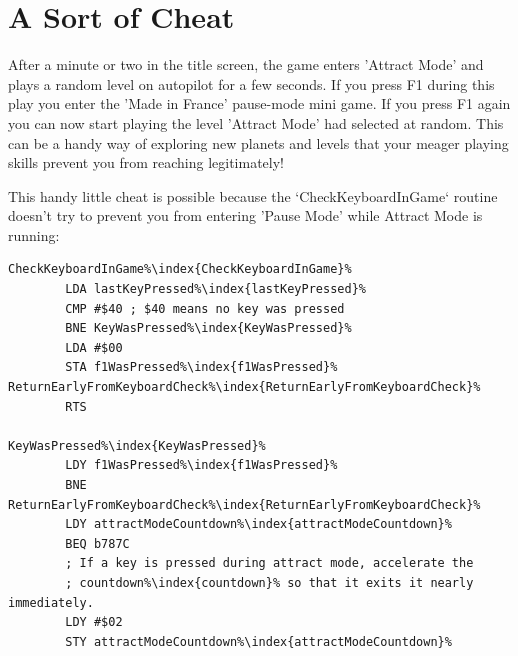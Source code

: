 \section{A Sort of Cheat}

After a minute or two in the title screen, the game enters 'Attract Mode' and
plays a random level on autopilot for a few seconds. If you press F1 during
this play you enter the 'Made in France' pause-mode mini game. If you press F1
again you can now start playing the level 'Attract Mode' had selected at random. This can be a handy way of exploring new planets and levels that your meager playing skills prevent you from reaching legitimately!

This handy little cheat is possible because the `CheckKeyboardInGame` routine doesn't try to prevent you
from entering 'Pause Mode' while Attract Mode is running:

\begin{lstlisting}[caption=A trap door to new worlds in Attract Mode,escapechar=\%]
CheckKeyboardInGame%\index{CheckKeyboardInGame}%
        LDA lastKeyPressed%\index{lastKeyPressed}%
        CMP #$40 ; $40 means no key was pressed
        BNE KeyWasPressed%\index{KeyWasPressed}%
        LDA #$00
        STA f1WasPressed%\index{f1WasPressed}%
ReturnEarlyFromKeyboardCheck%\index{ReturnEarlyFromKeyboardCheck}%   
        RTS

KeyWasPressed%\index{KeyWasPressed}%   
        LDY f1WasPressed%\index{f1WasPressed}%
        BNE ReturnEarlyFromKeyboardCheck%\index{ReturnEarlyFromKeyboardCheck}%
        LDY attractModeCountdown%\index{attractModeCountdown}%
        BEQ b787C
        ; If a key is pressed during attract mode, accelerate the
        ; countdown%\index{countdown}% so that it exits it nearly immediately.
        LDY #$02
        STY attractModeCountdown%\index{attractModeCountdown}%
\end{lstlisting}

